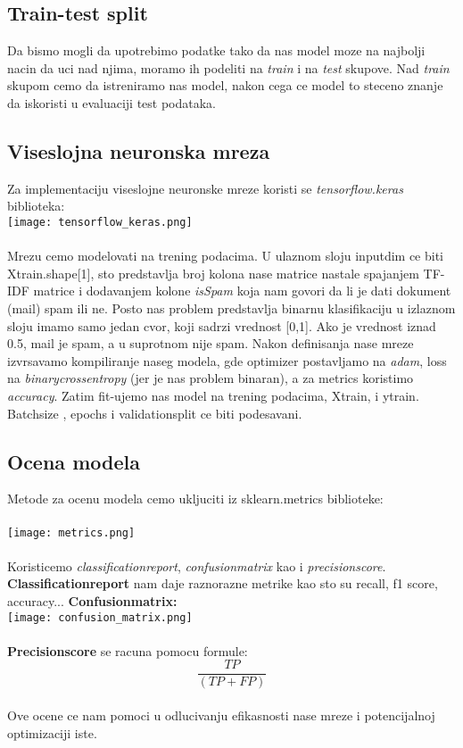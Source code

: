 \documentclass{article}
\begin{document}
\subsection{Train-test split}
Da bismo mogli da upotrebimo podatke tako da nas model moze na najbolji nacin da uci nad njima, moramo ih podeliti na \textit{train} i na \textit{test} skupove. Nad \textit{train} skupom cemo da istreniramo nas model, nakon cega ce model to steceno znanje da iskoristi u evaluaciji test podataka.\\


\subsection{Viseslojna neuronska mreza}
Za implementaciju viseslojne neuronske mreze koristi se \textit{tensorflow.keras} biblioteka: \\

\texttt{[image: tensorflow\_keras.png]}\\
\\
Mrezu cemo modelovati na trening podacima. U ulaznom sloju input\textunderscore dim ce biti X\textunderscore train.shape[1], sto predstavlja broj kolona nase matrice nastale spajanjem TF-IDF matrice i dodavanjem kolone \textit{isSpam} koja nam govori da li je dati dokument (mail) spam ili ne. Posto nas problem predstavlja binarnu klasifikaciju u izlaznom sloju imamo samo jedan cvor, koji sadrzi vrednost [0,1]. Ako je vrednost iznad 0.5, mail je spam, a u suprotnom nije spam. Nakon definisanja nase mreze izvrsavamo kompiliranje naseg modela, gde optimizer postavljamo na \textit{adam}, loss na \textit{binary\textunderscore crossentropy} (jer je nas problem binaran), a za metrics koristimo \textit{accuracy}. Zatim fit-ujemo nas model na trening podacima, X\textunderscore train, i y\textunderscore train. Batch\textunderscore size , epochs i validation\textunderscore split ce biti podesavani.


\clearpage
\subsection{Ocena modela}
Metode za ocenu modela cemo ukljuciti iz sklearn.metrics biblioteke:\\
\\
\texttt{[image: metrics.png]}\\
\\
Koristicemo \textit{classification\textunderscore report}, \textit{confusion\textunderscore matrix} kao i \textit{precision\textunderscore score}. \\
\textbf{Classification\textunderscore report} nam daje raznorazne metrike kao sto su recall, f1 score, accuracy...
\textbf{Confusion\textunderscore matrix:}\\
\texttt{[image: confusion\_matrix.png]}\\
\\
\textbf{Precision\textunderscore score} se racuna pomocu formule:\\
$$\frac{TP}{(TP + FP)}$$ \\
Ove ocene ce nam pomoci u odlucivanju efikasnosti nase mreze i potencijalnoj optimizaciji iste.
\end{document}

